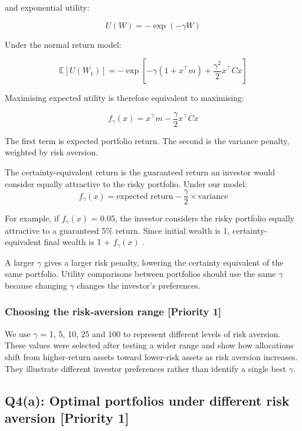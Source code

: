 \documentclass[
  10pt,
  a4paper,
]{article}
\begin{document}
and exponential utility:

\[
U(W)=-\exp(-\gamma W)
\]

Under the normal return model:

\[
\mathbb E[U(W_1)]=-\exp\!\left[-\gamma(1+x^\top m)+\frac{\gamma^2}{2}x^\top Cx\right]
\]

Maximising expected utility is therefore equivalent to maximising:

\[
f_\gamma(x)=x^\top m-\frac{\gamma}{2}x^\top Cx
\]

The first term is expected portfolio return. The second is the variance
penalty, weighted by risk aversion.

The certainty-equivalent return is the guaranteed return an investor
would consider equally attractive to the risky portfolio. Under our
model: \[
f_\gamma(x)=\text{expected return}-\frac{\gamma}{2}\times\text{variance}
\]

For example, if \(f_\gamma(x)\) = 0.05, the investor considers the risky
portfolio equally attractive to a guaranteed 5\% return. Since initial
wealth is 1, certainty-equivalent final wealth is 1 + \(f_\gamma(x)\) .

A larger \(\gamma\) gives a larger risk penalty, lowering the certainty
equivalent of the same portfolio. Utility comparisons between portfolios
should use the same \(\gamma\) because changing \(\gamma\) changes the
investor's preferences.

\hypertarget{choosing-the-risk-aversion-range-priority-1}{%
\subsubsection{Choosing the risk-aversion range {[}Priority
1{]}}\label{choosing-the-risk-aversion-range-priority-1}}

We use \(\gamma\) = 1, 5, 10, 25 and 100 to represent different levels
of risk aversion. These values were selected after testing a wider range
and show how allocations shift from higher-return assets toward
lower-risk assets as risk aversion increases. They illustrate different
investor preferences rather than identify a single best \(\gamma\).

\hypertarget{q4a-optimal-portfolios-under-different-risk-aversion-priority-1}{%
\subsection{Q4(a): Optimal portfolios under different risk aversion
{[}Priority
1{]}}\label{q4a-optimal-portfolios-under-different-risk-aversion-priority-1}}
\end{document}
